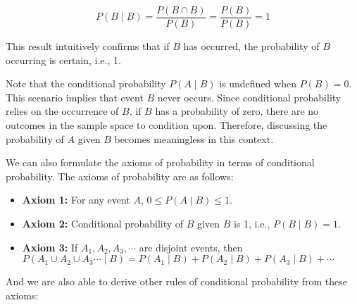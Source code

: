 \[
P(B \mid B) = \frac{P(B \cap B)}{P(B)} = \frac{P(B)}{P(B)} = 1
\]

This result intuitively confirms that if \( B \) has occurred, the probability of \( B \) occurring is certain, i.e., 1.

Note that the conditional probability \( P(A \mid B) \) is undefined when \( P(B) = 0 \). This scenario implies that event \( B \) never occurs. Since conditional probability relies on the occurrence of \( B \), if \( B \) has a probability of zero, there are no outcomes in the sample space to condition upon. Therefore, discussing the probability of \( A \) given \( B \) becomes meaningless in this context.

We can also formulate the axioms of probability in terms of conditional probability. The axioms of probability are as follows:

\begin{axiom}
    \begin{itemize}
        \item \textbf{Axiom 1:} For any event \(A\), \( 0 \leq P(A\mid B) \leq 1 \).
        \item \textbf{Axiom 2:} Conditional probability of $B$ given $B$ is 1, i.e., $P(B \mid B)=1$.
        \item \textbf{Axiom 3:} If \(A_1, A_2, A_3, \cdots\) are disjoint events, then $P\left(A_1 \cup A_2 \cup A_3 \cdots \mid B\right)=P\left(A_1 \mid B\right)+P\left(A_2 \mid B\right)+P\left(A_3 \mid B\right)+\cdots$
    \end{itemize}
\end{axiom}

And we are also able to derive other rules of conditional probability from these axioms:

